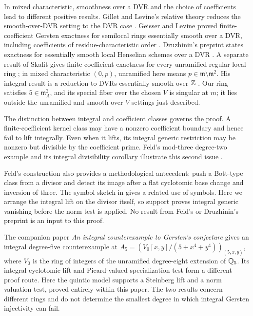 In mixed characteristic, smoothness over a DVR and the choice of
coefficients lead to different positive results. Gillet and Levine's
relative theory reduces the smooth-over-DVR setting to the DVR
case \cite{GilletLevine}. Geisser and Levine proved finite-coefficient
Gersten exactness for semilocal rings essentially smooth over a DVR,
including coefficients of residue-characteristic order
\cite[Theorem 8.2]{GeisserLevine}. Druzhinin's preprint states exactness
for essentially smooth local Henselian schemes over a DVR
\cite[Theorem 4.5]{Druzhinin}. A separate result of Skalit gives
finite-coefficient exactness for every unramified regular local
ring \cite[Corollary 5.7]{Skalit}; in mixed characteristic $(0,p)$,
unramified here means $p\in\mathfrak m\setminus\mathfrak m^2$.
His integral result is a reduction to DVRs essentially smooth over
$\mathbb Z$ \cite[Theorem 5.4]{Skalit}. Our ring satisfies
$5\in\mathfrak m_A^2$, and its special fiber over the chosen $V$
is singular at $m$; it lies outside the unramified and
smooth-over-$V$ settings just described.

The distinction between integral and coefficient classes governs the
proof. A finite-coefficient kernel class may have a nonzero coefficient
boundary and hence fail to lift integrally. Even when it lifts, its
integral generic restriction may be nonzero but divisible by the
coefficient prime. Feld's mod-three degree-two example and its integral
divisibility corollary illustrate this second issue
\cite[Theorem 1.1 and Corollary 5.1]{Feld}.

Feld's construction also provides a methodological antecedent:
push a Bott-type class from a divisor and detect its image after a
flat cyclotomic base change and inversion of three. The symbol
sketch in \cite[Remark 5.3, footnote 3]{Feld} gives a related use of
symbols. Here we arrange the integral lift on the divisor itself,
so support proves integral generic vanishing before the norm test
is applied. No result from Feld's or Druzhinin's preprint is an
input to this proof.

The companion paper \emph{An integral counterexample to Gersten's
conjecture} \cite[Theorem 1.1]{IntegralDegreeFive} gives an
integral degree-five counterexample at
$A_5=(V_0[x,y]/(5+x^4+y^4))_{(5,x,y)}$, where $V_0$ is the ring of
integers of the unramified degree-eight extension of $\mathbb Q_5$.
Its integral cyclotomic lift and Picard-valued specialization test
form a different proof route. Here the quintic model supports a
Steinberg lift and a norm valuation test, proved entirely within
this paper. The two results concern different rings and do not
determine the smallest degree in which integral Gersten injectivity
can fail.

